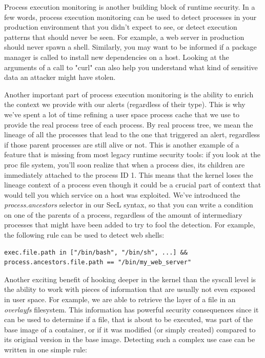 Process execution monitoring is another building block of runtime security.
In a few words, process execution monitoring can be used to detect processes in your production environment that you didn’t expect to see, or detect execution patterns that should never be seen.
For example, a web server in production should never spawn a shell.
Similarly, you may want to be informed if a package manager is called to install new dependencies on a host.
Looking at the arguments of a call to "curl" can also help you understand what kind of sensitive data an attacker might have stolen.

Another important part of process execution monitoring is the ability to enrich the context we provide with our alerts (regardless of their type).
This is why we’ve spent a lot of time refining a user space process cache that we use to provide the real process tree of each process.
By real process tree, we mean the lineage of all the processes that lead to the one that triggered an alert, regardless if those parent processes are still alive or not.
This is another example of a feature that is missing from most legacy runtime security tools: if you look at the proc file system, you’ll soon realize that when a process dies, its children are immediately attached to the process ID 1.
This means that the kernel loses the lineage context of a process even though it could be a crucial part of context that would tell you which service on a host was exploited.
We’ve introduced the \emph{process.ancestors} selector in our SecL syntax, so that you can write a condition on one of the parents of a process, regardless of the amount of intermediary processes that might have been added to try to fool the detection.
For example, the following rule can be used to detect web shells:

\begin{lstlisting}[language={},caption={Process execution monitoring rule example},label={lst:RuntimeSecurityMonitoringWithEBPF:ProcessRule}]
exec.file.path in ["/bin/bash", "/bin/sh", ...] && process.ancestors.file.path == "/bin/my_web_server"
\end{lstlisting}

Another exciting benefit of hooking deeper in the kernel than the syscall level is the ability to work with pieces of information that are usually not even exposed in user space.
For example, we are able to retrieve the layer of a file in an \emph{overlayfs} filesystem.
This information has powerful security consequences since it can be used to determine if a file, that is about to be executed, was part of the base image of a container, or if it was modified (or simply created) compared to its original version in the base image.
Detecting such a complex use case can be written in one simple rule:

